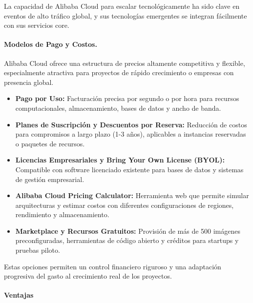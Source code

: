 {                La capacidad de Alibaba Cloud para escalar tecnológicamente ha sido clave en eventos de alto tráfico global, y sus tecnologías emergentes se integran fácilmente con sus servicios core.
                
                \paragraph{Modelos de Pago y Costos.}
                Alibaba Cloud ofrece una estructura de precios altamente competitiva y flexible, especialmente atractiva para proyectos de rápido crecimiento o empresas con presencia global.
                
                \begin{itemize}
                    \item \textbf{Pago por Uso:} Facturación precisa por segundo o por hora para recursos computacionales, almacenamiento, bases de datos y ancho de banda.
                    \item \textbf{Planes de Suscripción y Descuentos por Reserva:} Reducción de costos para compromisos a largo plazo (1-3 años), aplicables a instancias reservadas o paquetes de recursos.
                    \item \textbf{Licencias Empresariales y Bring Your Own License (BYOL):} Compatible con software licenciado existente para bases de datos y sistemas de gestión empresarial.
                    \item \textbf{Alibaba Cloud Pricing Calculator:} Herramienta web que permite simular arquitecturas y estimar costos con diferentes configuraciones de regiones, rendimiento y almacenamiento.
                    \item \textbf{Marketplace y Recursos Gratuitos:} Provisión de más de 500 imágenes preconfiguradas, herramientas de código abierto y créditos para startups y pruebas piloto.
                \end{itemize}
                
                Estas opciones permiten un control financiero riguroso y una adaptación progresiva del gasto al crecimiento real de los proyectos.
                
                \paragraph{Ventajas}
                
}
